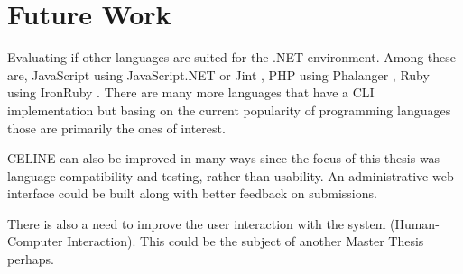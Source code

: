\section{Future Work}

Evaluating if other languages are suited for the .NET environment. Among these are, JavaScript using JavaScript.NET \cite{JavaScript.NET} or Jint \cite{Jint}, PHP using Phalanger \cite{Phalanger}, Ruby using IronRuby \cite{IronRuby}. There are many more languages that have a CLI implementation but basing on the current popularity of programming languages \cite{Tiobe} those are primarily the ones of interest.

CELINE can also be improved in many ways since the focus of this thesis was language compatibility and testing, rather than usability. An administrative web interface could be built along with better feedback on submissions.

There is also a need to improve the user interaction with the system (Human-Computer Interaction). This could be the subject of another Master Thesis perhaps.
